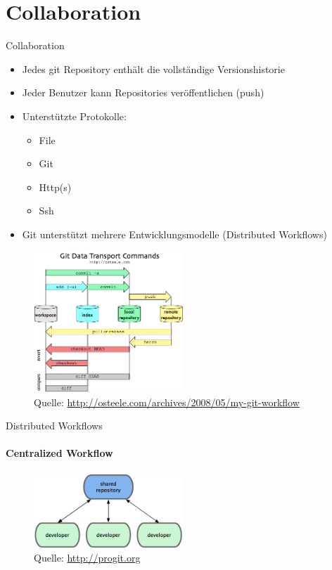 \section{Collaboration}

\begin{frame}
  \tableofcontents[currentsection]
\end{frame}

\begin{frame}{Collaboration}
  \begin{itemize}
    \item Jedes git Repository enthält die vollständige Versionshistorie
    \item Jeder Benutzer kann Repositories veröffentlichen (push)
    \item Unterstützte Protokolle:
    \begin{itemize}
      \item File
      \item Git
      \item Http(s)
      \item Ssh
    \end{itemize}
    \item Git unterstützt mehrere Entwicklungsmodelle (Distributed Workflows)
  \end{itemize}
\end{frame}

\begin{frame}
  \begin{figure}
    \includegraphics[width=0.5\textwidth]{img/git-transport}
    \caption[format=empty]{Quelle: \url{http://osteele.com/archives/2008/05/my-git-workflow}}
  \end{figure}
  
\end{frame}

\begin{frame}{Distributed Workflows}
  \framesubtitle{Centralized Workflow}
  \begin{figure}
    \includegraphics[width=0.5\textwidth]{img/wf-centralized}
    \caption[format=empty]{Quelle: \url{http://progit.org}}
  \end{figure}
\end{frame}
    
